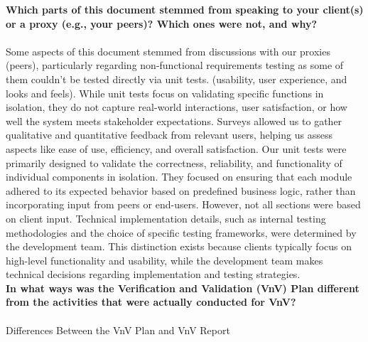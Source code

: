\documentclass[12pt, titlepage]{article}
\begin{document}
  \newline  \newline \textbf{Which parts of this document stemmed from speaking to your client(s) or a proxy (e.g., your peers)? Which ones were not, and why?}  \\\\
  Some aspects of this document stemmed from discussions with our proxies (peers), particularly regarding non-functional requirements testing as some of them couldn’t be tested directly via unit tests. (usability, user experience, and looks and feels). While unit tests focus on validating specific functions in isolation, they do not capture real-world interactions, user satisfaction, or how well the system meets stakeholder expectations. Surveys allowed us to gather qualitative and quantitative feedback from relevant users, helping us assess aspects like ease of use, efficiency, and overall satisfaction. Our unit tests were primarily designed to validate the correctness, reliability, and functionality of individual components in isolation. They focused on ensuring that each module adhered to its expected behavior based on predefined business logic, rather than incorporating input from peers or end-users.
  \newline
  However, not all sections were based on client input. Technical implementation details, such as internal testing methodologies and the choice of specific testing frameworks, were determined by the development team. This distinction exists because clients typically focus on high-level functionality and usability, while the development team makes technical decisions regarding implementation and testing strategies. \\ 
  \newline
  \textbf{In what ways was the Verification and Validation (VnV) Plan different from the activities that were actually conducted for VnV?} \\\\
    Differences Between the VnV Plan and VnV Report
\end{document}
